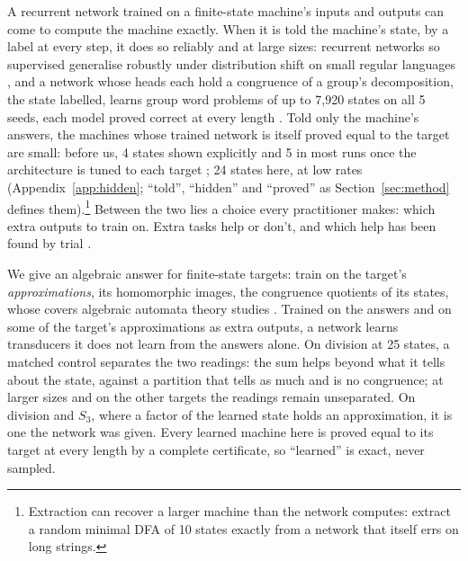 \documentclass[11pt]{article}
\begin{document}
A recurrent network trained on a finite-state machine's inputs and outputs can come to compute the
machine exactly. When it is told the machine's state, by a label at every step, it does so reliably
and at large sizes: recurrent networks so supervised generalise robustly under distribution shift on small regular languages
\citep{dan-2022-robust-generalization-regular-languages}, and a network whose heads each hold a
congruence of a group's decomposition, the state labelled, learns group word problems of up to 7{,}920 states on all 5 seeds, each model
proved correct at every length \citep{brandoit-2026-length-independent-state-tracking}. Told only the machine's answers, the machines whose trained network is itself proved equal to the
target are small: before us, 4 states shown explicitly
\citep{zeng-1993-self-clustering-recurrent-networks} and 5 in most runs once the architecture is
tuned to each target \citep{aichernig-2024-learning-minimal-automata-rnn}; 24 states here, at low rates
(Appendix~\ref{app:hidden}; ``told'', ``hidden'' and ``proved'' as Section~\ref{sec:method}
defines them).\footnote{Extraction can recover a larger machine than the network computes:
\citet{omlin-1996-extraction-rules-discrete-time-rnn} extract a random minimal DFA of 10 states
exactly from a network that itself errs on long strings.} Between the two lies a choice every
practitioner makes: which extra outputs to train on. Extra tasks help or don't, and which help has
been found by trial \citep{caruana-1997-multitask-learning,both-2025-joint-task-training-small-models}.

We give an algebraic answer for finite-state targets: train on the target's \emph{approximations},
its homomorphic images, the congruence quotients of its states, whose covers algebraic automata
theory studies
\citep{hartmanis-stearns-1966-algebraic-structure-theory,krohn-rhodes-1965-algebraic-theory-machines,egri-nagy-2024-covering-lemma-transformation-semigroups}.
Trained on the answers and on some of the target's approximations as extra outputs, a network learns
transducers it does not learn from the answers alone. On division at 25 states, a matched control
separates the two readings: the sum helps beyond what it tells about the state, against a partition
that tells as much and is no congruence; at larger sizes and on the other targets the readings remain
unseparated. On division and $S_3$, where a factor of the learned state holds an approximation, it is one
the network was given. Every learned machine here is proved equal
to its target at every length by a complete certificate, so ``learned'' is exact, never sampled.
\end{document}
